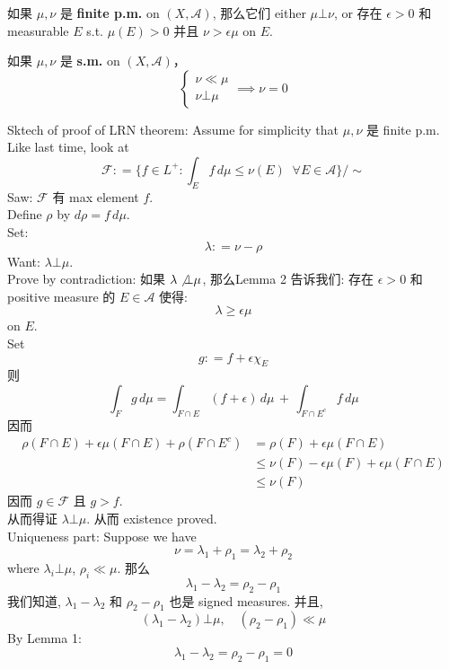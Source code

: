\documentclass[lang=cn,11pt]{elegantbook}
\begin{document}
\begin{lemma}
    如果 $\mu,\nu$ 是 \textbf{finite p.m.} on $(X,\mathcal{A})$, 那么它们 either $\mu\bot \nu$, or 存在 $\epsilon>0$ 和 measurable $E$ s.t. $\mu(E) > 0$ 并且 $\nu  > \epsilon \mu$ on $E$. 
\end{lemma}



\begin{lemma}
    如果 $\mu,\nu$ 是\textbf{ s.m.} on $(X,\mathcal{A})$， \[\begin{cases}
        \nu \ll \mu \\
        \nu \bot \mu
    \end{cases} \implies \nu  = 0 \]
\end{lemma}


Sktech of proof of LRN theorem: 
Assume for simplicity that $\mu,\nu$ 是 finite p.m.\\
Like last time, look at \[
\mathcal{F} : =  \{f\in L^+ : \int_E f\, d\mu \leq \nu(E) \;\; \forall E\in\mathcal{A}  \} / \sim
\]
Saw: $\mathcal{F} $ 有 max element $f$.\\
Define $\rho$ by $d \rho = f \, d \mu$.\\
Set: \[
\lambda : = \nu - \rho
\]
Want: $\lambda \bot \mu$.\\
Prove by contradiction: 如果 $\lambda \not \bot \mu$, 那么Lemma 2 告诉我们: 存在 $\epsilon > 0$ 和 positive measure 的 $E \in \mathcal{A}$ 使得: \[
\lambda \geq \epsilon \mu
\]
on $E$.\\
Set \[
g: = f + \epsilon\chi_E 
\]
则 \[
\int_F g \, d\mu = \int_{F \cap E} (f + \epsilon)\, d\mu \, + \, \int_{F \cap E^c} f \, d\mu
 \]
因而 \begin{align*}
    \rho (F \cap E)  + \epsilon \mu (F \cap E) + \rho (F \cap E^c) &= \rho(F) + \epsilon \mu(F \cap E) \\
    &\leq \nu(F) - \epsilon \mu(F)  + \epsilon \mu (F\cap E) \\
    &\leq \nu(F)
\end{align*} 
因而 $g \in \mathcal{F}$ 且 $g > f$.\\
从而得证 $\lambda \bot \mu$. 从而 existence proved.\\
Uniqueness part: Suppose we have \[
\nu = \lambda_1 + \rho_1 = \lambda_2 + \rho_2
\]
where $\lambda_i \bot \mu$, $\rho_i \ll \mu$.
那么 \[
\lambda_1  - \lambda_2 =  \rho_2 - \rho_1
\]
我们知道, $\lambda_1  - \lambda_2 $ 和 $ \rho_2 - \rho_1$ 也是 signed measures. 并且, 
\[
(\lambda_1  - \lambda_2) \bot \mu ,\quad ( \rho_2 - \rho_1) \ll \mu 
\]
By Lemma 1: \[
\lambda_1  - \lambda_2 =  \rho_2 - \rho_1 = 0
\]
\end{document}
